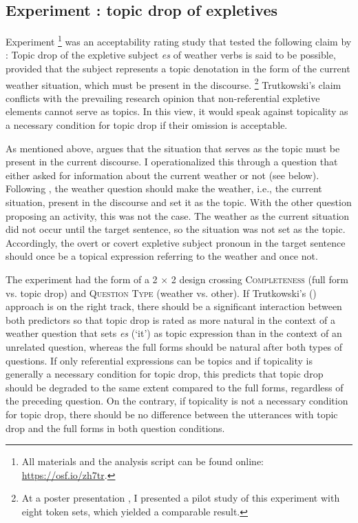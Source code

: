 \subsection{Experiment : topic drop of expletives}
\label{sec:exp.ex}  
Experiment %
\footnote{All materials and the analysis script can be found online: \url{https://osf.io/zh7tr}.}
%
was an acceptability rating study that tested the following claim by \citet{trutkowski2011, trutkowski2016}:
Topic drop of the expletive subject \textit{es} of weather verbs is said to be possible, provided that the subject represents a topic denotation in the form of the current weather situation, which must be present in the discourse.%
\footnote{\label{note:ex.pilot}At a poster presentation \citep{schafer2022}, I presented a pilot study of this experiment with eight token sets, which yielded a comparable result.}
%
Trutkowski's claim conflicts with the prevailing research opinion that non-referential expletive elements cannot serve as topics.
In this view, it would speak against topicality as a necessary condition for topic drop if their omission is acceptable.

As mentioned above, \citet{trutkowski2011,trutkowski2016} argues that the situation that serves as the topic must be present in the current discourse.
I operationalized this through a question that either asked for information about the current weather or not (see  below).
Following \citet{trutkowski2011,trutkowski2016}, the weather question should make the weather, i.e., the current situation, present in the discourse and set it as the topic.
With the other question proposing an activity, this was not the case.
The weather as the current situation did not occur until the target sentence, so the situation was not set as the topic.
Accordingly, the overt or covert expletive subject pronoun in the target sentence should once be a topical expression referring to the weather and once not. 

The experiment had the form of a 2 $\times$ 2 design crossing \textsc{Completeness} (full form vs. topic drop) and \textsc{Question Type} (weather vs. other).
If Trutkowski's (\citeyear{trutkowski2011,trutkowski2016}) approach is on the right track, there should be a significant interaction between both predictors so that topic drop is rated as more natural in the context of a weather question that sets \textit{es} (`it') as topic expression than in the context of an unrelated question, whereas the full forms should be natural after both types of questions.
If only referential expressions can be topics and if topicality is generally a necessary condition for topic drop, this predicts that topic drop should be degraded to the same extent compared to the full forms, regardless of the preceding question.
On the contrary, if topicality is not a necessary condition for topic drop, there should be no difference between the utterances with topic drop and the full forms in both question conditions.

